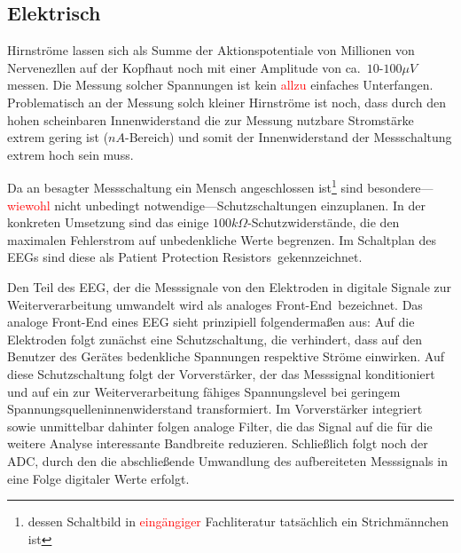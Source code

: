 \documentclass[12pt,a4paper,notitlepage]{article}
\newcommand{\annot}[1]{\textcolor{red}{#1}}
\begin{document}
\subsection{Elektrisch}
Hirnströme lassen sich als Summe der Aktionspotentiale von Millionen von Nervenezllen auf der Kopfhaut noch mit einer Amplitude von ca.\ $10$-$100\mu V$ messen\cite{MAYER1}. Die Messung solcher Spannungen ist kein \annot{allzu} einfaches Unterfangen. Problematisch an der Messung solch kleiner Hirnströme ist noch, dass durch den hohen scheinbaren Innenwiderstand die zur Messung nutzbare Stromstärke extrem gering ist ($nA$-Bereich) und somit der Innenwiderstand der Messschaltung extrem hoch sein muss.

Da an besagter Messschaltung ein Mensch angeschlossen ist\footnote{dessen Schaltbild in \annot{eingängiger} Fachliteratur tatsächlich ein Strichmännchen ist} sind besondere---\annot{wiewohl} nicht unbedingt notwendige---Schutzschaltungen einzuplanen. In der konkreten Umsetzung sind das einige $100k\Omega$-Schutzwiderstände, die den maximalen \gls{Fehlerstrom} auf unbedenkliche Werte begrenzen. Im Schaltplan des EEGs sind diese als \glqq Patient Protection Resistors\grqq\ gekennzeichnet.

Den Teil des \gls{EEG}, der die Messsignale von den Elektroden in digitale Signale zur Weiterverarbeitung umwandelt wird als \glqq analoges Front-End\grqq\ bezeichnet. Das analoge Front-End eines \gls{EEG} sieht prinzipiell folgendermaßen aus: Auf die Elektroden folgt zunächst eine Schutzschaltung, die verhindert, dass auf den Benutzer des Gerätes bedenkliche Spannungen respektive Ströme einwirken. Auf diese Schutzschaltung folgt der Vorverstärker, der das Messsignal konditioniert und auf ein zur Weiterverarbeitung fähiges Spannungslevel bei geringem Spannungsquelleninnenwiderstand transformiert. Im Vorverstärker integriert sowie unmittelbar dahinter folgen analoge Filter, die das Signal auf die für die weitere Analyse interessante Bandbreite reduzieren. Schließlich folgt noch der \gls{ADC}, durch den die abschließende Umwandlung des aufbereiteten Messsignals in eine Folge digitaler Werte erfolgt.\cite{LINEAR3,MAXIM3,MAXIM9,MAXIM21,MAXIM59,TEXAS12,LINEAR1,LINEAR2,LINEAR4,LINEAR5}
\end{document}
